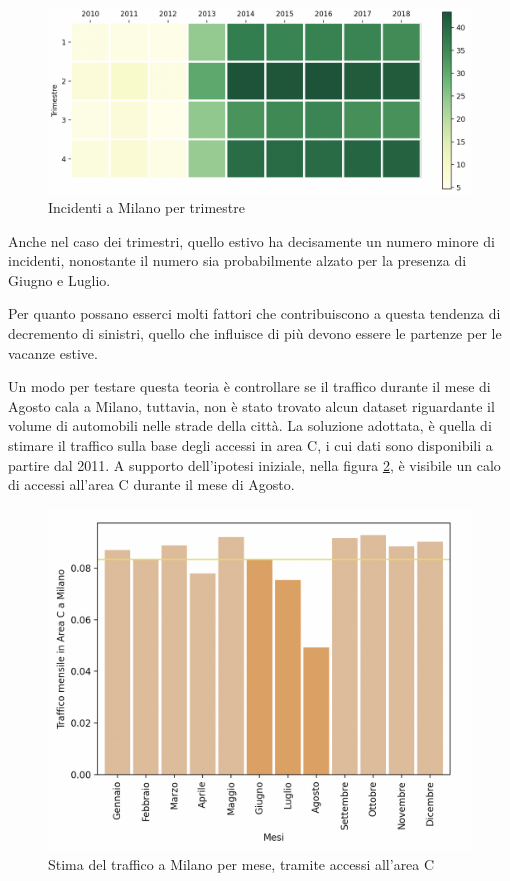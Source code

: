 \documentclass[a4paper]{report}
\begin{document}
\begin{figure}
    \includegraphics[width=\linewidth]{../src/incidenti/incidenti_senza_coords/mese_incidenti/trimestri.png}
    \caption{Incidenti a Milano per trimestre}
    \label{fig:milano-trimestri}
\end{figure}

Anche nel caso dei trimestri, quello estivo ha decisamente un numero minore di incidenti, 
nonostante il numero sia probabilmente alzato per la presenza di Giugno e Luglio.

Per quanto possano esserci molti fattori che contribuiscono a questa tendenza di decremento di sinistri, 
quello che influisce di più devono essere le partenze per le vacanze estive.

Un modo per testare questa teoria è controllare se il traffico durante il mese di Agosto cala a Milano, 
tuttavia, non è stato trovato alcun dataset riguardante il volume di automobili nelle strade della città.
La soluzione adottata, è quella di stimare il traffico sulla base degli accessi in area C, i cui dati 
sono disponibili a partire dal 2011.
A supporto dell'ipotesi iniziale, nella figura \ref{fig:stima-traffico-mensile}, 
è visibile un calo di accessi all'area C durante il mese di Agosto.

\begin{figure}
    \includegraphics[width=\linewidth]{../src/area_c/stima_traffico_mensile.png}
    \caption{Stima del traffico a Milano per mese, tramite accessi all'area C}
    \label{fig:stima-traffico-mensile}
\end{figure}
\end{document}
